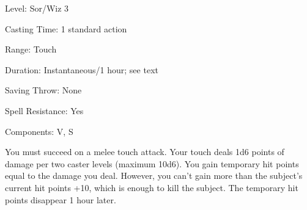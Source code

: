 
\begin{description*}
\item[Level:] Sor/Wiz 3
\item[Casting Time:] 1 standard action
\item[Range:] Touch
\item[Duration:] Instantaneous/1 hour; see text
\item[Saving Throw:] None
\item[Spell Resistance:] Yes
\item[Components:] V, S
\end{description*}

You must succeed on a melee touch attack. Your touch deals 1d6 points of damage
per two caster levels (maximum 10d6). You gain temporary hit points equal to the
damage you deal. However, you can't gain more than the subject's current hit points
+10, which is enough to kill the subject. The temporary hit points disappear 1
hour later.